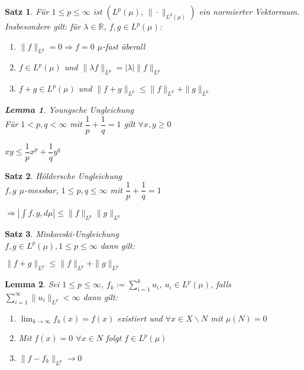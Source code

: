 \documentclass[11pt]{memoir}
\theoremstyle{changebreak}
\newtheorem{Lemma}{Lemma}[chapter]
\newtheorem{Satz}{Satz}[chapter]
\begin{document}
\begin{Satz}
Für $1 \leq p \leq \infty$ ist $(L^p(\mu),\, \|\cdotp\|_{L^p(\mu)})$ ein normierter Vektorraum. Insbesondere gilt: für $\lambda \in \mathbb R$, $f, g \in L^p(\mu)$:
\begin{enumerate}
	\item $\|f\|_{L^p} = 0 \Rightarrow f=0$ $\mu$-fast überall
	\item $f \in L^p(\mu)$ und $\|\lambda f\|_{L^p} = |\lambda|\|f\|_{L^p}$
	\item $f +g \in L^p(\mu)$ und $\|f + g\|_{L^p} \leq \|f\|_{L^p} + \|g\|_{L^p}$
\end{enumerate}

\begin{Lemma}
\emph{Youngsche Ungleichung} \\
Für $1 < p, q < \infty$ mit $\dfrac{1}{p}+\dfrac{1}{q} =1$ gilt $\forall x, y \geq 0$
\begin{center}
	$xy \leq \dfrac{1}{p}x^p + \dfrac{1}{q}y^q$
\end{center}
\end{Lemma}
\end{Satz}

\begin{Satz}
\emph{Höldersche Ungleichung} \\
$f, g$ $\mu$-messbar, $1 \leq p, q \leq \infty$ mit $\dfrac{1}{p}+\dfrac{1}{q} =1$ \\
\begin{center}
	$\Rightarrow \left| \int f, g, d\mu\right| \leq \|f\|_{L^p}\|g\|_{L^p}$
\end{center}
\end{Satz}


\begin{Satz}
\emph{Minkovski-Ungleichung} \\
$f, g \in L^p(\mu), 1 \leq p \leq \infty$ dann gilt:
\begin{center}
	$\|f+g\|_{L^p} \leq \|f\|_{L^p} + \|g\|_{L^p}$
\end{center}
\end{Satz}

\begin{Lemma}
Sei $1 \leq p \leq \infty$, $f_k := \sum\limits_{i=1}^k u_i$, $u_i \in L^p(\mu)$, falls $\sum\limits_{i=1}^\infty \|u_i\|_{L^p} < \infty$ dann gilt:
\begin{enumerate}
	\item $\lim_{k \rightarrow \infty} f_k (x) = f(x)$ existiert und $\forall x \in X\backslash N$ mit $\mu(N) =0$
	\item Mit $f(x) = 0$ $\forall x \in N$ folgt $f \in L^p(\mu)$
	\item $\|f-f_k\|_{L^p} \rightarrow 0$
\end{enumerate}
\end{Lemma}
\end{document}
